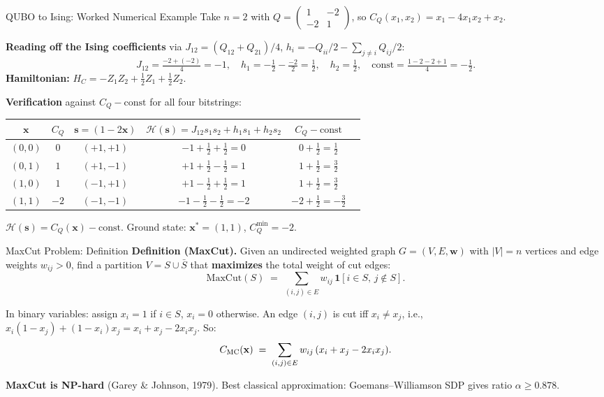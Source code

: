 \documentclass{beamer}
\begin{document}
\begin{frame}{QUBO to Ising: Worked Numerical Example}
Take $n=2$ with $Q = \begin{pmatrix}1 & -2\\ -2 & 1\end{pmatrix}$,
so $C_Q(x_1,x_2) = x_1 - 4x_1x_2 + x_2$.

\medskip
\textbf{Reading off the Ising coefficients} via $J_{12}=(Q_{12}+Q_{21})/4$,
$h_i = -Q_{ii}/2 - \sum_{j\neq i}Q_{ij}/2$:
\[
J_{12} = \tfrac{-2+(-2)}{4} = -1,\quad
h_1 = -\tfrac{1}{2}-\tfrac{-2}{2} = \tfrac{1}{2},\quad
h_2 = \tfrac{1}{2},\quad
\text{const} = \tfrac{1-2-2+1}{4} = -\tfrac{1}{2}.
\]
\textbf{Hamiltonian:}
$H_C = -Z_1Z_2 + \tfrac{1}{2}Z_1 + \tfrac{1}{2}Z_2$.

\medskip
\textbf{Verification} against $C_Q - \text{const}$ for all four bitstrings:
\begin{center}
\small
\begin{tabular}{cccccc}
\hline
$\mathbf{x}$ & $C_Q$ & $\mathbf{s}=(1-2\mathbf{x})$ & $\mathcal{H}(\mathbf{s})=J_{12}s_1s_2+h_1s_1+h_2s_2$ & $C_Q-\text{const}$ \\
\hline
$(0,0)$ & $0$  & $(+1,+1)$ & $-1+\tfrac{1}{2}+\tfrac{1}{2}=0$ & $0+\tfrac{1}{2}=\tfrac{1}{2}$ \\
$(0,1)$ & $1$  & $(+1,-1)$ & $+1+\tfrac{1}{2}-\tfrac{1}{2}=1$ & $1+\tfrac{1}{2}=\tfrac{3}{2}$ \\
$(1,0)$ & $1$  & $(-1,+1)$ & $+1-\tfrac{1}{2}+\tfrac{1}{2}=1$ & $1+\tfrac{1}{2}=\tfrac{3}{2}$ \\
$(1,1)$ & $-2$ & $(-1,-1)$ & $-1-\tfrac{1}{2}-\tfrac{1}{2}=-2$ & $-2+\tfrac{1}{2}=-\tfrac{3}{2}$ \\
\hline
\end{tabular}
\end{center}
$\mathcal{H}(\mathbf{s}) = C_Q(\mathbf{x}) - \text{const}$. \checkmark\quad
Ground state: $\mathbf{x}^*=(1,1)$, $C_Q^{\min}=-2$.
\end{frame}


\begin{frame}{MaxCut Problem: Definition}
\textbf{Definition (MaxCut).}  Given an undirected weighted graph
$G = (V,E,\mathbf{w})$ with $|V|=n$ vertices and edge weights
$w_{ij}>0$, find a partition $V = S \cup \bar{S}$ that
\textbf{maximizes} the total weight of cut edges:
\[
\text{MaxCut}(S) \;=\; \sum_{(i,j)\in E} w_{ij}\,
\mathbf{1}[i\in S,\,j\notin S].
\]

\medskip

In binary variables: assign $x_i = 1$ if $i\in S$, $x_i=0$ otherwise.
An edge $(i,j)$ is cut iff $x_i \neq x_j$, i.e., $x_i(1-x_j) +
(1-x_i)x_j = x_i + x_j - 2x_ix_j$. So:
\[
C_{\rm MC}(\mathbf{x}) \;=\;
\sum_{(i,j)\in E} w_{ij}\,(x_i + x_j - 2x_ix_j).
\]

\textbf{MaxCut is NP-hard} (Garey \& Johnson, 1979). Best classical
approximation: Goemans--Williamson SDP gives ratio $\alpha \ge 0.878$.
\end{frame}
\end{document}
